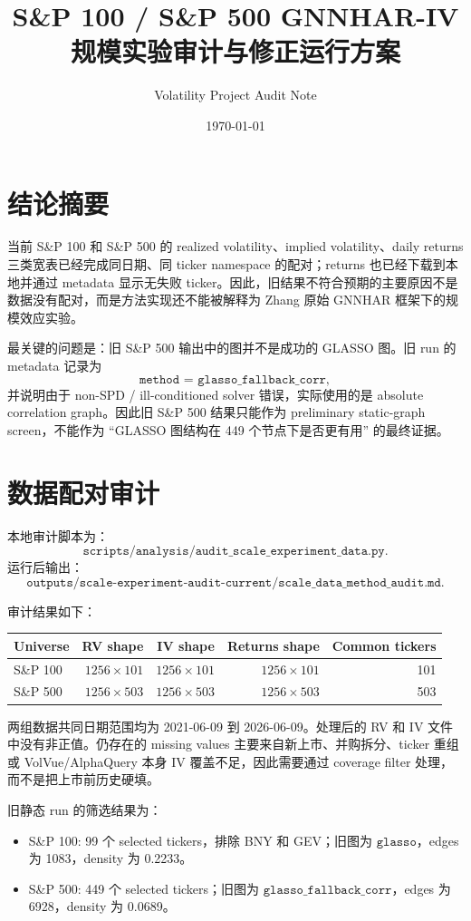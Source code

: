 \documentclass[11pt,a4paper]{ctexart}
\title{S\&P 100 / S\&P 500 GNNHAR-IV 规模实验审计与修正运行方案}
\author{Volatility Project Audit Note}
\date{\today}
\begin{document}
\maketitle

\section{结论摘要}

当前 S\&P 100 和 S\&P 500 的 realized volatility、implied volatility、daily returns 三类宽表已经完成同日期、同 ticker namespace 的配对；returns 也已经下载到本地并通过 metadata 显示无失败 ticker。因此，旧结果不符合预期的主要原因不是数据没有配对，而是方法实现还不能被解释为 Zhang 原始 GNNHAR 框架下的规模效应实验。

最关键的问题是：旧 S\&P 500 输出中的图并不是成功的 GLASSO 图。旧 run 的 metadata 记录为
\[
\texttt{method = glasso\_fallback\_corr},
\]
并说明由于 non-SPD / ill-conditioned solver 错误，实际使用的是 absolute correlation graph。因此旧 S\&P 500 结果只能作为 preliminary static-graph screen，不能作为 ``GLASSO 图结构在 449 个节点下是否更有用'' 的最终证据。

\section{数据配对审计}

本地审计脚本为：
\[
\texttt{scripts/analysis/audit\_scale\_experiment\_data.py}.
\]
运行后输出：
\[
\texttt{outputs/scale-experiment-audit-current/scale\_data\_method\_audit.md}.
\]

审计结果如下：

\begin{longtable}{lrrrr}
\toprule
Universe & RV shape & IV shape & Returns shape & Common tickers \\
\midrule
\endhead
S\&P 100 & \(1256\times 101\) & \(1256\times 101\) & \(1256\times 101\) & 101 \\
S\&P 500 & \(1256\times 503\) & \(1256\times 503\) & \(1256\times 503\) & 503 \\
\bottomrule
\end{longtable}

两组数据共同日期范围均为 2021-06-09 到 2026-06-09。处理后的 RV 和 IV 文件中没有非正值。仍存在的 missing values 主要来自新上市、并购拆分、ticker 重组或 VolVue/AlphaQuery 本身 IV 覆盖不足，因此需要通过 coverage filter 处理，而不是把上市前历史硬填。

旧静态 run 的筛选结果为：
\begin{itemize}[leftmargin=*]
\item S\&P 100: 99 个 selected tickers，排除 BNY 和 GEV；旧图为 \(\texttt{glasso}\)，edges 为 1083，density 为 0.2233。
\item S\&P 500: 449 个 selected tickers；旧图为 \(\texttt{glasso\_fallback\_corr}\)，edges 为 6928，density 为 0.0689。
\end{itemize}
\end{document}
